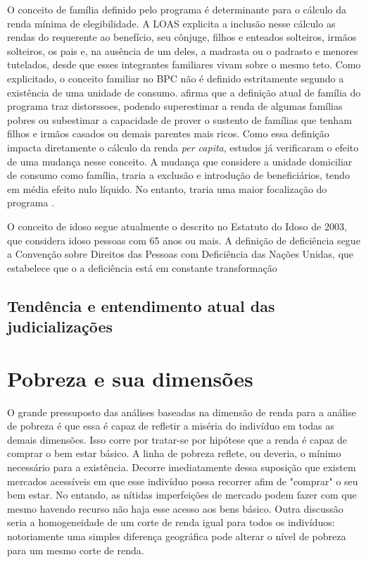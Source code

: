 \documentclass[
	12pt,				%
	openright,			%
	twoside,			%
	a4paper,			%
	english,			%
	french,				%
	spanish,			%
	brazil				%
	]{abntex2}
\begin{document}
		O conceito de família definido pelo programa é determinante para o cálculo da renda mínima de elegibilidade. A LOAS explicita a inclusão nesse cálculo as rendas do requerente ao benefício, seu cônjuge, filhos e enteados solteiros, irmãos solteiros, os pais e, na ausência de um deles, a madrasta ou o padrasto e menores tutelados, desde que esses integrantes familiares vivam sobre o mesmo teto. Como explicitado, o conceito familiar no BPC não é definido estritamente segundo a existência de uma unidade de consumo.  afirma que a definição atual de família do programa traz distorssoes, podendo superestimar a renda de algumas famílias pobres ou subestimar a capacidade de prover o sustento de famílias que tenham filhos e irmãos casados ou demais parentes mais ricos. Como essa definição impacta diretamente o cálculo da renda \textit{per capita}, estudos já verificaram o efeito de uma mudança nesse conceito. A mudança que considere a unidade domiciliar de consumo como família, traria a exclusão e introdução de beneficiários, tendo em média efeito nulo líquido. No entanto, traria uma maior focalização do programa \cite{medeiros2009mudancca,fambpcfreitas}.
		
		O conceito de idoso segue atualmente o descrito no Estatuto do Idoso de 2003, que considera idoso pessoas com 65 anos ou mais. A definição de deficiência segue a Convenção sobre Direitos das Pessoas com Deficiência das Nações Unidas, que estabelece que o a deficiência está em constante transformação 
		
		
		
		
		
\section{Tendência e entendimento atual das judicializações}

\chapter{Pobreza e sua dimensões}
O grande pressuposto das análises baseadas na dimensão de renda para a análise de pobreza é que essa é capaz de refletir a miséria do indivíduo em todas as demais dimensões. Isso corre por tratar-se por hipótese que a renda é capaz de comprar o bem estar básico. A linha de pobreza reflete, ou deveria, o mínimo necessário para a existência. Decorre imediatamente dessa suposição que existem mercados acessíveis em que esse indivíduo possa recorrer afim de "comprar" o seu bem estar. No entando, as nítidas imperfeições de mercado podem fazer com que mesmo havendo recurso não haja esse acesso aos bens básico. Outra discussão seria a homogeneidade de um corte de renda igual para todos os indivíduos: notoriamente uma simples diferença geográfica pode alterar o nível de pobreza para um mesmo corte de renda. 
\end{document}
